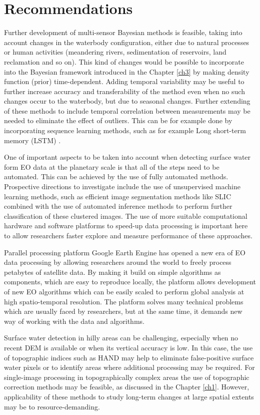 \section{Recommendations}

Further development of multi-sensor Bayesian methods is feasible, taking into account changes in the waterbody configuration, either due to natural processes or human activities (meandering rivers, sedimentation of reservoirs, land reclamation and so on). This kind of changes would be possible to incorporate into the Bayesian framework introduced in the Chapter \ref{ch3} by making density function (prior) time-dependent. Adding temporal variability may be useful to further increase accuracy and transferability of the method even when no such changes occur to the waterbody, but due to seasonal changes. Further extending of these methods to include temporal correlation between measurements may be needed to eliminate the effect of outliers. This can be for example done by incorporating sequence learning methods, such as for example Long short-term memory (LSTM) \citet{hochreiter1997long}.

One of important aspects to be taken into account when detecting surface water form EO data at the planetary scale is that all of the steps need to be automated. This can be achieved by the use of fully automated methods. Prospective directions to investigate include the use of unsupervised machine learning methods, such as efficient image segmentation methods like SLIC \citet{achanta2012slic} combined with the use of automated inference methods to perform further classification of these clustered images. The use of more suitable computational hardware and software platforms to speed-up data processing \citet{donchyts2017slic} is important here to allow researchers faster explore and measure performance of these approaches.

Parallel processing platform Google Earth Engine has opened a new era of EO data processing by allowing researchers around the world to freely process petabytes of satellite data. By making it build on simple algorithms as components, which are easy to reproduce locally, the platform allows development of new EO algorithms which can be easily scaled to perform global analysis at high spatio-temporal resolution. The platform solves many technical problems which are usually faced by researchers, but at the same time, it demands new way of working with the data and algorithms.

Surface water detection in hilly areas can be challenging, especially when no recent DEM is available or when its vertical accuracy is low. In this case, the use of topographic indices such as HAND \citet{Nobre2011} may help to eliminate false-positive surface water pixels or to identify areas where additional processing may be required. For single-image processing in topographically complex areas the use of topographic correction methods may be feasible, as discussed in the Chapter \ref{ch1}. However, applicability of these methods to study long-term changes at large spatial extents may be to resource-demanding.

